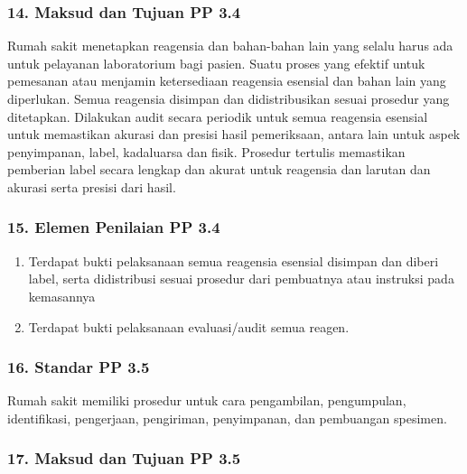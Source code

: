 \documentclass[
]{book}
\providecommand{\tightlist}{%
  \setlength{\itemsep}{0pt}\setlength{\parskip}{0pt}}
\begin{document}
\hypertarget{maksud-dan-tujuan-pp-3.4}{%
\subsubsection*{14. Maksud dan Tujuan PP 3.4}\label{maksud-dan-tujuan-pp-3.4}}

Rumah sakit menetapkan reagensia dan bahan-bahan lain yang selalu harus ada untuk pelayanan laboratorium bagi pasien. Suatu proses yang efektif untuk pemesanan atau menjamin ketersediaan reagensia esensial dan bahan lain yang diperlukan. Semua reagensia disimpan dan didistribusikan sesuai prosedur yang ditetapkan. Dilakukan audit secara periodik untuk semua reagensia esensial untuk memastikan akurasi dan presisi hasil pemeriksaan, antara lain untuk aspek penyimpanan, label, kadaluarsa dan fisik. Prosedur tertulis memastikan pemberian label secara lengkap dan akurat untuk reagensia dan larutan dan akurasi serta presisi dari hasil.

\hypertarget{elemen-penilaian-pp-3.4}{%
\subsubsection*{15. Elemen Penilaian PP 3.4}\label{elemen-penilaian-pp-3.4}}

\begin{enumerate}
\def\labelenumi{\alph{enumi}.}
\tightlist
\item
  Terdapat bukti pelaksanaan semua reagensia esensial disimpan dan diberi label, serta didistribusi sesuai prosedur dari pembuatnya atau instruksi pada kemasannya
\item
  Terdapat bukti pelaksanaan evaluasi/audit semua reagen.
\end{enumerate}

\hypertarget{standar-pp-3.5}{%
\subsubsection*{16. Standar PP 3.5}\label{standar-pp-3.5}}

Rumah sakit memiliki prosedur untuk cara pengambilan, pengumpulan, identifikasi, pengerjaan, pengiriman, penyimpanan, dan pembuangan spesimen.

\hypertarget{maksud-dan-tujuan-pp-3.5}{%
\subsubsection*{17. Maksud dan Tujuan PP 3.5}\label{maksud-dan-tujuan-pp-3.5}}
\end{document}
